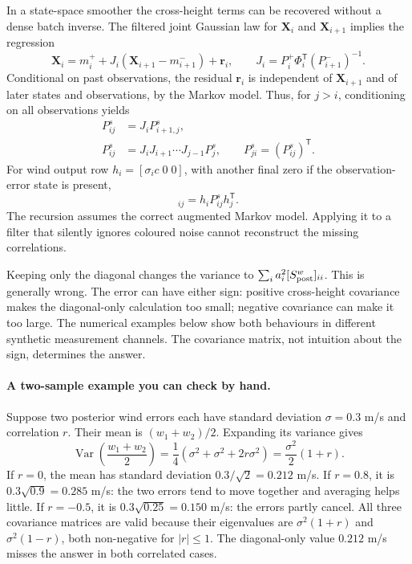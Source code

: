 \documentclass[11pt,a4paper]{article}
\numberwithin{equation}{section}
\newcommand{\Var}{\operatorname{Var}}
\begin{document}
In a state-space smoother the cross-height terms can be recovered without a dense batch inverse. The filtered joint Gaussian law for $\mathbf X_i$ and $\mathbf X_{i+1}$ implies the regression
\begin{equation}
 \mathbf X_i=m_i^++J_i(\mathbf X_{i+1}-m_{i+1}^-)+\mathbf r_i,
 \qquad J_i=P_i^+\Phi_i^{\mathsf T}(P_{i+1}^-)^{-1}.
\end{equation}
Conditional on past observations, the residual $\mathbf r_i$ is independent of $\mathbf X_{i+1}$ and of later states and observations, by the Markov model. Thus, for $j>i$, conditioning on all observations yields
\begin{align}
 P^s_{ij}&=J_iP^s_{i+1,j},\\
 \boxed{P^s_{ij}}&=\boxed{J_iJ_{i+1}\cdots J_{j-1}P_j^s},\qquad
 P^s_{ji}=(P^s_{ij})^{\mathsf T}.
\end{align}
For wind output row $h_i=[\sigma_i c\;0\;0]$, with another final zero if the observation-error state is present,
\begin{equation}
 [S^w_{\rm post}]_{ij}=h_iP^s_{ij}h_j^{\mathsf T}.
\end{equation}
The recursion assumes the correct augmented Markov model. Applying it to a filter that silently ignores coloured noise cannot reconstruct the missing correlations.

Keeping only the diagonal changes the variance to $\sum_i a_i^2[S^w_{\rm post}]_{ii}$. This is generally wrong. The error can have either sign: positive cross-height covariance makes the diagonal-only calculation too small; negative covariance can make it too large. The numerical examples below show both behaviours in different synthetic measurement channels. The covariance matrix, not intuition about the sign, determines the answer.

\paragraph{A two-sample example you can check by hand.}
Suppose two posterior wind errors each have standard deviation $\sigma=0.3$ m/s and correlation $r$. Their mean is $(w_1+w_2)/2$. Expanding its variance gives
\begin{equation}
 \Var\left(\frac{w_1+w_2}{2}\right)
 =\frac14(\sigma^2+\sigma^2+2r\sigma^2)
 =\frac{\sigma^2}{2}(1+r).
\end{equation}
If $r=0$, the mean has standard deviation $0.3/\sqrt2=0.212$ m/s. If $r=0.8$, it is $0.3\sqrt{0.9}=0.285$ m/s: the two errors tend to move together and averaging helps little. If $r=-0.5$, it is $0.3\sqrt{0.25}=0.150$ m/s: the errors partly cancel. All three covariance matrices are valid because their eigenvalues are $\sigma^2(1+r)$ and $\sigma^2(1-r)$, both non-negative for $|r|\leq1$. The diagonal-only value $0.212$ m/s misses the answer in both correlated cases.
\end{document}

